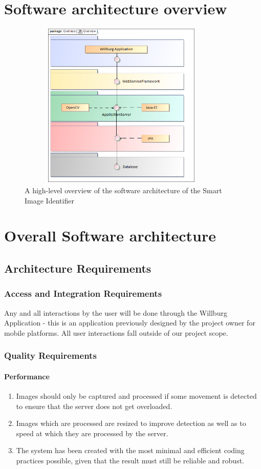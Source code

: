 \documentclass[a4paper,12pt]{report}
\begin{document}
\section {Software architecture overview}

	\begin{figure}[htb]
		\centering
		\includegraphics [height= 8cm, width=10cm]{../Diagrams/SystemOverview.png}
		\caption{A high-level overview of the software architecture of the Smart Image Identifier}
	\end{figure}


\section {Overall Software architecture}	
\subsection{Architecture Requirements}
\subsubsection{Access and Integration Requirements}
Any and all interactions by the user will be done through the Willburg Application - this is an application previously designed by the project owner for mobile platforms. All user interactions fall outside of our project scope. 
\subsubsection{Quality Requirements}
\paragraph{Performance}
\begin{enumerate}
	\item Images should only be captured and processed if some movement is detected to ensure that the server does not get overloaded.
	\item Images which are processed are resized to improve detection as well as to speed at which they are processed by the server.
	\item The system has been created with the most minimal and efficient coding practices possible, given that the result must still be reliable and robust.
\end{enumerate}
\end{document}
